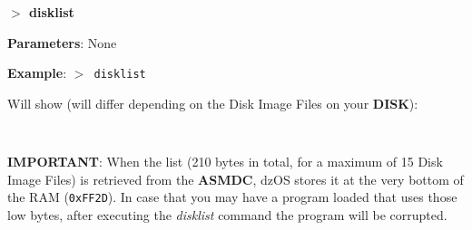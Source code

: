         \hspace{1.9cm}\textbf{$>$ disklist}

        \textbf{Parameters}: None

        \textbf{Example}: \texttt{$>$ disklist}

        Will show (will differ depending on the Disk Image Files on your
        \textbf{DISK}):

        \texttt{
        }

        \hfill\break

        \textbf{IMPORTANT}: When the list (210 bytes in total, for a maximum of
        15 Disk Image Files) is retrieved from the \textbf{ASMDC}, dzOS stores
        it at the very bottom of the RAM (\texttt{0xFF2D}). In case that you may
        have a program loaded that uses those low bytes, after executing the
        \textit{disklist} command the program will be corrupted.


        
        

